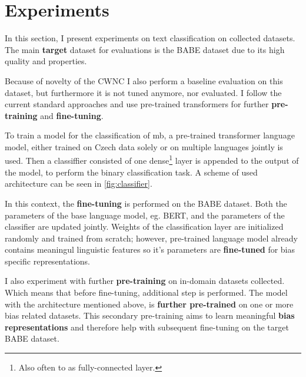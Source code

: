 \chapter{Experiments}\label{experiments}
In this section, I present experiments on text classification on collected datasets. The main \textbf{target} dataset for evaluations is the BABE dataset due to its high quality and properties.

Because of novelty of the CWNC I also perform a baseline evaluation on this dataset, but furthermore it is not tuned anymore, nor evaluated.
I follow the current standard approaches and use pre-trained transformers for further \textbf{pre-training} and \textbf{fine-tuning}.

To train a model for the classification of \gls{mb}, a pre-trained transformer language model, either trained on Czech data solely or on multiple languages jointly is used. Then a classiffier consisted of one dense\footnote{Also often to as fully-connected layer.} layer is appended to the output of the model, to perform the binary classification task. A scheme of used architecture can be seen in \ref{fig:classifier}.

In this context, the \textbf{fine-tuning} is performed on the BABE dataset. Both the parameters of the base language model, eg. BERT, and the parameters of the classifier are updated jointly. Weights of the classification layer are initialized randomly and trained from scratch; however, pre-trained language model already contains meaningul linguistic features so it's parameters are \textbf{fine-tuned} for bias specific representations.

I also experiment with further \textbf{pre-training} on in-domain datasets collected. Which means that before fine-tuning, additional step is performed. The model with the architecture mentioned above, is \textbf{further pre-trained} on one or more bias related datasets. This secondary pre-training aims to learn meaningful \textbf{bias representations} and therefore help with subsequent fine-tuning on the target BABE dataset.



\begin{figure}
\end{figure}

